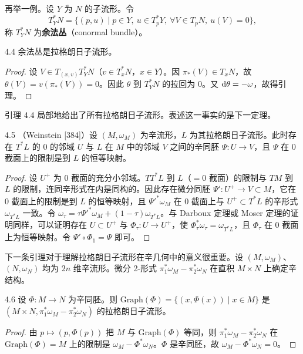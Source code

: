 再举一例。设 $Y$ 为 $N$ 的子流形。令
\[
  T_Y^*N=\{(p,u)\mid p\in Y,\ u\in T_p^*Y,\ \forall V\in T_pN,\ u(V)=0\},
\]
称 $T_Y^*N$ 为\textbf{余法丛}（conormal bundle）。

\begin{lemma*}{4.4}
  余法丛是拉格朗日子流形。
\end{lemma*}
\begin{proof}
  设 $V\in T_{(x,v)}T_Y^*N$（$v\in T_x^*N$，$x\in Y$）。因 $\pi_*(V)\in T_xN$，故 $\theta(V)=v(\pi_*(V))=0$。因此 $\theta$ 到 $T_Y^*N$ 的拉回为 $0$。又 $\mathrm{d}\theta=-\omega$，故得引理。
\end{proof}

引理 4.4 局部地给出了所有拉格朗日子流形。表述这一事实的是下一定理。

\begin{theorem*}{4.5}
  （Weinstein [384]）设 $(M,\omega_M)$ 为辛流形，$L$ 为其拉格朗日子流形。此时存在 $T^*L$ 的 $0$ 的邻域 $U$ 与 $L$ 在 $M$ 中的邻域 $V$ 之间的辛同胚 $\Psi:U\to V$，且 $\Psi$ 在 $0$ 截面上的限制是到 $L$ 的恒等映射。
\end{theorem*}
\begin{proof}
  设 $U^+$ 为 $0$ 截面的充分小邻域。$TT^*L$ 到 $L$（$=0$ 截面）的限制与 $TM$ 到 $L$ 的限制，连同辛形式在内是同构的。因此存在微分同胚 $\Psi':U^+\to V\subset M$，它在 $0$ 截面上的限制是到 $L$ 的恒等映射，且 $\Psi'^*\omega_M$ 在 $0$ 截面上与 $U^+\subset T^*L$ 的辛形式 $\omega_{T^*L}$ 一致。令 $\omega_\tau=\tau\Psi'^*\omega_M+(1-\tau)\omega_{T^*L}$。与 Darboux 定理或 Moser 定理的证明同样，可以证明存在 $U\subset U^+$ 与 $\Phi_\tau:U\to U^+$，使 $\Phi_\tau^*\omega_\tau=\omega_{T^*L}$，且 $\Phi_\tau$ 在 $0$ 截面上为恒等映射。令 $\Psi'\circ\Phi_1=\Psi$ 即可。
\end{proof}

下一条引理对于理解拉格朗日子流形在辛几何中的意义很重要。设 $(M,\omega_M)$、$(N,\omega_N)$ 均为 $2n$ 维辛流形。微分 2-形式 $\pi_1^*\omega_M-\pi_2^*\omega_N$ 在直积 $M\times N$ 上确定辛结构。

\begin{lemma*}{4.6}
  设 $\Phi:M\to N$ 为辛同胚。则 $\mathrm{Graph}(\Phi)=\{(x,\Phi(x))\mid x\in M\}$ 是 $(M\times N,\pi_1^*\omega_M-\pi_2^*\omega_N)$ 的拉格朗日子流形。
\end{lemma*}
\begin{proof}
  由 $p\mapsto(p,\Phi(p))$ 把 $M$ 与 $\mathrm{Graph}(\Phi)$ 等同，则 $\pi_1^*\omega_M-\pi_2^*\omega_N$ 在 $\mathrm{Graph}(\Phi)=M$ 上的限制是 $\omega_M-\Phi^*\omega_N$。$\Phi$ 是辛同胚，故 $\omega_M-\Phi^*\omega_N=0$。
\end{proof}

